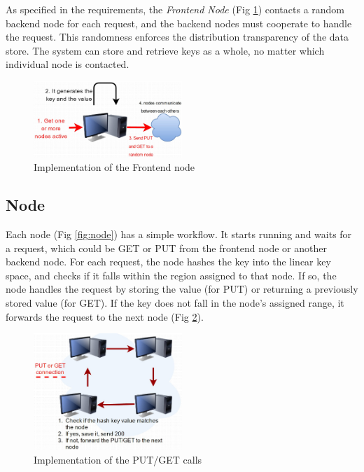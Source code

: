 \documentclass[11pt,conference]{IEEEtran}
\begin{document}
As specified in the requirements, the \textit{Frontend Node} (Fig
\ref{fig:frontend}) contacts a random backend node for each request, and the
backend nodes must cooperate to handle the request. This randomness enforces the
distribution transparency of the data store. The system can store and retrieve
keys as a whole, no matter which individual node is contacted.

\begin{figure}[h!]
  \centering
    \includegraphics[width=0.5\textwidth]{frontend}
    \caption{Implementation of the Frontend node}
    \label{fig:frontend}
\end{figure}

\subsection{Node}

Each node (Fig \ref{fig:node}) has a simple workflow. It starts running and
waits for a request, which could be GET or PUT from the frontend node or another
backend node. For each request, the node hashes the key into the linear key
space, and checks if it falls within the region assigned to that node. If so,
the node handles the request by storing the value (for PUT) or returning a
previously stored value (for GET). If the key does not fall in the node's
assigned range, it forwards the request to the next node (Fig \ref{fig:putget}).

\begin{figure}[h!]
  \centering
    \includegraphics[width=0.5\textwidth]{putget}
    \caption{Implementation of the PUT/GET calls}
    \label{fig:putget}
\end{figure}
\end{document}
